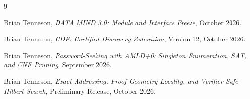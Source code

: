 \documentclass[11pt]{article}
\begin{document}
\begin{thebibliography}{9}

Brian Tenneson,
\emph{DATA MIND 3.0: Module and Interface Freeze},
October 2026.

Brian Tenneson,
\emph{CDF: Certified Discovery Federation},
Version 12, October 2026.

Brian Tenneson,
\emph{Password-Seeking with AMLD+0: Singleton Enumeration, SAT, and CNF Pruning},
September 2026.

Brian Tenneson,
\emph{Exact Addressing, Proof Geometry Locality, and Verifier-Safe Hilbert Search},
Preliminary Release, October 2026.

\end{thebibliography}
\end{document}
